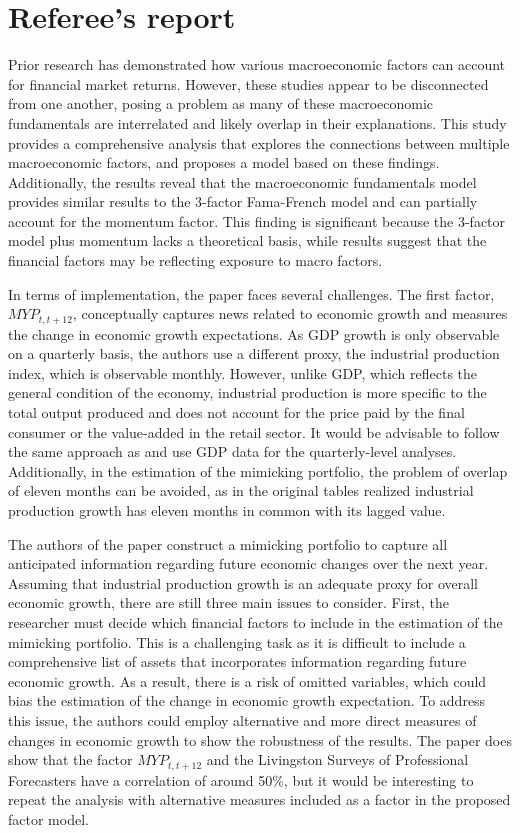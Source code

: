 \documentclass[12pt,a4paper]{ouparticle}
\begin{document}
% 


\section{Referee's report}
Prior research has demonstrated how various macroeconomic factors can account for financial market returns. However, these studies appear to be disconnected from one another, posing a problem as many of these macroeconomic fundamentals are interrelated and likely overlap in their explanations. This study provides a comprehensive analysis that explores the connections between multiple macroeconomic factors, and proposes a model based on these findings. Additionally, the results reveal that the macroeconomic fundamentals model provides similar results to the 3-factor Fama-French model and can partially account for the momentum factor. This finding is significant because the 3-factor model plus momentum lacks a theoretical basis, while results suggest that the financial factors may be reflecting exposure to macro factors.

In terms of implementation, the paper faces several challenges. The first factor, $MYP_{t,t+12}$, conceptually captures news related to economic growth and measures the change in economic growth expectations. As GDP growth is only observable on a quarterly basis, the authors use a different proxy, the industrial production index, which is observable monthly. However, unlike GDP, which reflects the general condition of the economy, industrial production is more specific to the total output produced and does not account for the price paid by the final consumer or the value-added in the retail sector. It would be advisable to follow the same approach as \cite{vassalou2003news} and use GDP data for the quarterly-level analyses. Additionally, in the estimation of the mimicking portfolio, the problem of overlap of eleven months can be avoided, as in the original tables realized industrial production growth has eleven months in common with its lagged value.

The authors of the paper construct a mimicking portfolio to capture all anticipated information regarding future economic changes over the next year. Assuming that industrial production growth is an adequate proxy for overall economic growth, there are still three main issues to consider. First, the researcher must decide which financial factors to include in the estimation of the mimicking portfolio. This is a challenging task as it is difficult to include a comprehensive list of assets that incorporates information regarding future economic growth. As a result, there is a risk of omitted variables, which could bias the estimation of the change in economic growth expectation. To address this issue, the authors could employ alternative and more direct measures of changes in economic growth to show the robustness of the results. The paper does show that the factor $MYP_{t,t+12}$ and the Livingston Surveys of Professional Forecasters have a correlation of around 50\%, but it would be interesting to repeat the analysis with alternative measures included as a factor in the proposed factor model.
\end{document}
